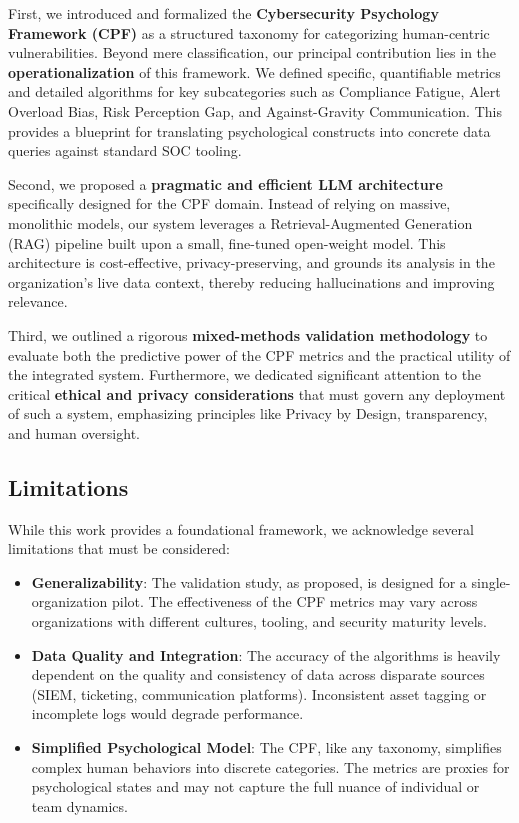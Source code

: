 \documentclass[11pt, a4paper]{article}
\begin{document}
First, we introduced and formalized the \textbf{Cybersecurity Psychology Framework (CPF)} as a structured taxonomy for categorizing human-centric vulnerabilities. Beyond mere classification, our principal contribution lies in the \textbf{operationalization} of this framework. We defined specific, quantifiable metrics and detailed algorithms for key subcategories such as Compliance Fatigue, Alert Overload Bias, Risk Perception Gap, and Against-Gravity Communication. This provides a blueprint for translating psychological constructs into concrete data queries against standard SOC tooling.

Second, we proposed a \textbf{pragmatic and efficient LLM architecture} specifically designed for the CPF domain. Instead of relying on massive, monolithic models, our system leverages a Retrieval-Augmented Generation (RAG) pipeline built upon a small, fine-tuned open-weight model. This architecture is cost-effective, privacy-preserving, and grounds its analysis in the organization's live data context, thereby reducing hallucinations and improving relevance.

Third, we outlined a rigorous \textbf{mixed-methods validation methodology} to evaluate both the predictive power of the CPF metrics and the practical utility of the integrated system. Furthermore, we dedicated significant attention to the critical \textbf{ethical and privacy considerations} that must govern any deployment of such a system, emphasizing principles like Privacy by Design, transparency, and human oversight.

\subsection{Limitations}
While this work provides a foundational framework, we acknowledge several limitations that must be considered:
\begin{itemize}
    \item \textbf{Generalizability}: The validation study, as proposed, is designed for a single-organization pilot. The effectiveness of the CPF metrics may vary across organizations with different cultures, tooling, and security maturity levels.
    \item \textbf{Data Quality and Integration}: The accuracy of the algorithms is heavily dependent on the quality and consistency of data across disparate sources (SIEM, ticketing, communication platforms). Inconsistent asset tagging or incomplete logs would degrade performance.
    \item \textbf{Simplified Psychological Model}: The CPF, like any taxonomy, simplifies complex human behaviors into discrete categories. The metrics are proxies for psychological states and may not capture the full nuance of individual or team dynamics.
\end{itemize}
\end{document}
